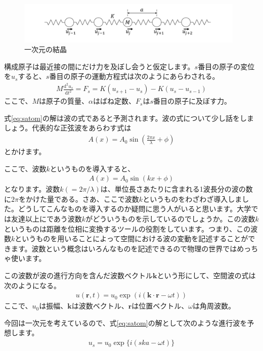 \documentclass[10pt,b5paper,papersize,dvipdfmx]{jsbook}
\begin{document}
\begin{figure}[htbp]
  \centering
  \includegraphics[height=2cm]{img/bane.pdf}  %
  \caption{一次元の結晶}
  \label{fig:bane}
\end{figure}
構成原子は最近接の間にだけ力を及ぼし会うと仮定します。$s$番目の原子の変位を$u_s$すると、$s$番目の原子の運動方程式は次のようにあらわされる。
\begin{align}
  M\frac{\mathrm{d}^2u_s}{\mathrm{d}t^2} = F_s = K (u_{s+1} - u_s) - K (u_s - u_{s-1})
  \label{eq:satom}
\end{align}
ここで、$M$は原子の質量、$\alpha$はばね定数、$F_s$は$s$番目の原子に及ぼす力。\par
式\ref{eq:satom}の解は波の式であると予測されます。波の式について少し話をしましょう。代表的な正弦波をあらわす式は
\begin{align}
  A(x) = A_0 \sin \left(\frac{2\pi x}{\lambda} + \phi \right)
\end{align}
とかけます。\par
ここで、波数$k$というものを導入すると、
\begin{align}
  A(x) = A_0 \sin (kx + \phi)
\end{align}
となります。波数$k (= 2\pi/\lambda)$は、単位長さあたりに含まれる1波長分の波の数に$2\pi$をかけた量である。さあ、ここで波数$k$というものをわざわざ導入しました。どうしてこんなものを導入するのか疑問に思う人がいると思います。大学では友達以上にであう波数$k$がどういうものを示しているのでしょうか。この波数$k$というものは距離を位相に変換するツールの役割をしています。つまり、この波数$k$というものを用いることによって空間における波の変動を記述することができます。波数という概念はいろんなものを記述できるので物理の世界ではめっちゃ使います。\par
この波数が波の進行方向を含んだ波数ベクトル$\bm{k}$という形にして、空間波の式は次のようになる。
\begin{align}
  u(\bm{r},t) = u_0 \exp(i(\bm{k} \cdot \bm{r} - \omega t))
\end{align}
ここで、$u_0$は振幅、$\bm{k}$は波数ベクトル、$\bm{r}$は位置ベクトル、$\omega$は角周波数。\par
今回は一次元を考えているので、式\ref{eq:satom}の解として次のような進行波を予想します。
\begin{align}
  u_s = u_0 \exp\{i(ska - \omega t)\}
\end{align}
\end{document}
